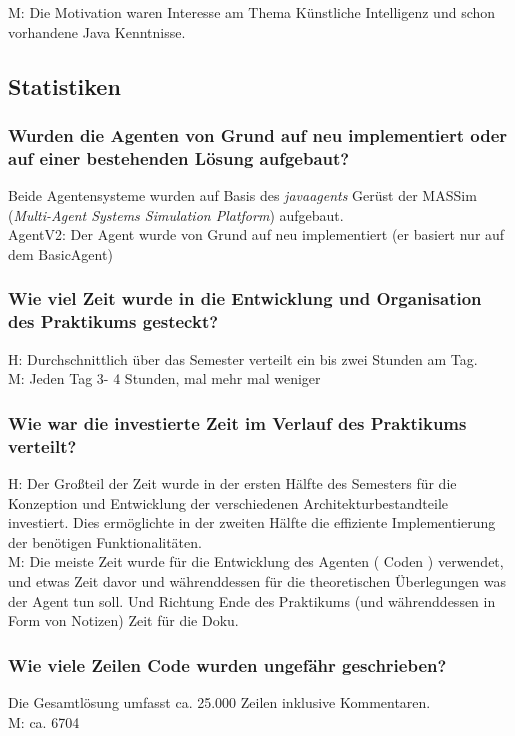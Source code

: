 \documentclass[runningheads]{llncs}
\begin{document}
M: Die Motivation waren Interesse am Thema Künstliche Intelligenz und schon vorhandene Java Kenntnisse.

\subsection{Statistiken}
\subsubsection{Wurden die Agenten von Grund auf neu implementiert oder auf einer bestehenden Lösung aufgebaut?\\}
Beide Agentensysteme wurden auf Basis des \textit{javaagents} Gerüst der MASSim (\textit{Multi-Agent Systems Simulation Platform}) aufgebaut. \\
AgentV2: Der Agent wurde von Grund auf neu implementiert (er basiert nur auf dem BasicAgent)
\subsubsection{Wie viel Zeit wurde in die Entwicklung und Organisation des Praktikums gesteckt?\\}
H: Durchschnittlich über das Semester verteilt ein bis zwei Stunden am Tag. \\
M: Jeden Tag 3- 4 Stunden, mal mehr mal weniger
\subsubsection{Wie war die investierte Zeit im Verlauf des Praktikums verteilt?\\}
H: Der Großteil der Zeit wurde in der ersten Hälfte des Semesters für die Konzeption und Entwicklung der verschiedenen Architekturbestandteile investiert. Dies ermöglichte in der zweiten Hälfte die effiziente Implementierung der benötigen Funktionalitäten.\\  
M: Die meiste Zeit wurde für die Entwicklung des Agenten ( Coden ) verwendet, und etwas Zeit davor und währenddessen für die theoretischen Überlegungen was der Agent tun soll. Und Richtung Ende des Praktikums (und währenddessen in Form von Notizen) Zeit für die Doku. 
\subsubsection{Wie viele Zeilen Code wurden ungefähr geschrieben?\\}
Die Gesamtlösung umfasst ca. 25.000 Zeilen inklusive Kommentaren. \\
M: ca. 6704
\end{document}
